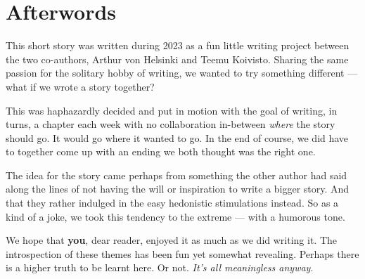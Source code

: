 \chapter*{Afterwords}

This short story was written during 2023 as a fun little writing project between the two co-authors, Arthur von Helsinki and Teemu Koivisto. Sharing the same passion for the solitary hobby of writing, we wanted to try something different — what if we wrote a story together?

This was haphazardly decided and put in motion with the goal of writing, in turns, a chapter each week with no collaboration in-between \textit{where} the story should go. It would go where it wanted to go. In the end of course, we did have to together come up with an ending we both thought was the right one.

The idea for the story came perhaps from something the other author had said along the lines of not having the will or inspiration to write a bigger story. And that they rather indulged in the easy hedonistic stimulations instead. So as a kind of a joke, we took this tendency to the extreme — with a humorous tone.

We hope that \textbf{you}, dear reader, enjoyed it as much as we did writing it. The introspection of these themes has been fun yet somewhat revealing. Perhaps there is a higher truth to be learnt here. Or not. \textit{It's all meaningless anyway}.
